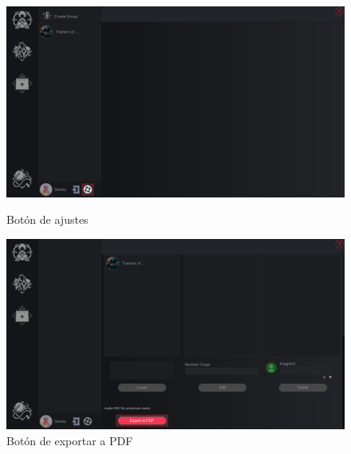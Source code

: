 \begin{figure}[H]
    \centering
    \begin{minipage}[b]{0.48\textwidth}
        \centering
        \includegraphics[width=\textwidth]{images/manualDeUsuario/EditarContactos&Grupos1.png}
        \caption*{Botón de ajustes}
    \end{minipage}
    \hfill
    \begin{minipage}[b]{0.48\textwidth}
        \centering
        \includegraphics[width=\textwidth]{images/manualDeUsuario/ExportarAPDF1.png}
        \caption*{Botón de exportar a PDF}
    \end{minipage}
\end{figure}